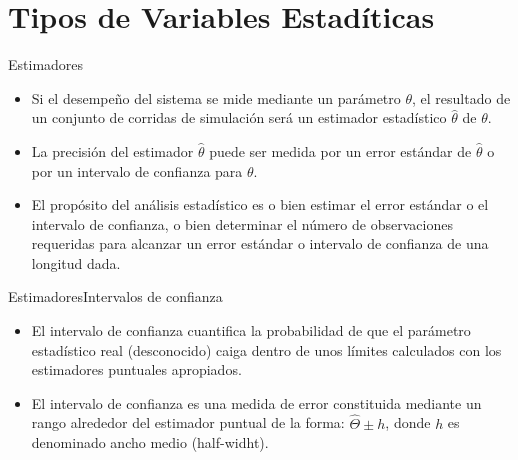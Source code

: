\section[Tipos de Estadísticas]{Tipos de Variables Estadíticas}

\begin{frame}{Estimadores}
    \begin{itemize}
        \item Si el desempeño del sistema se mide mediante un parámetro $\theta$, el resultado de un conjunto de corridas de simulación será un estimador estadístico $\hat{\theta}$ de $\theta$.
        \item La precisión del estimador $\hat{\theta}$ puede ser medida por un error estándar de $\hat{\theta}$ o por un intervalo de confianza para $\theta$.
        \item El propósito del análisis estadístico es o bien estimar el error estándar o el intervalo de confianza, o bien determinar el número de observaciones requeridas para alcanzar un error estándar o intervalo de confianza de una longitud dada.
    \end{itemize}
\end{frame}

\begin{frame}{Estimadores}{Intervalos de confianza}
    \begin{itemize}
        \item El intervalo de confianza cuantifica la probabilidad de que el parámetro estadístico real (desconocido) caiga dentro de unos límites calculados con los estimadores puntuales apropiados.
        \item El intervalo de confianza es una medida de error constituida mediante un rango alrededor del estimador puntual de la forma:
        $\hat{\Theta}\pm h$, donde $h$ es denominado ancho medio (half-widht).
    \end{itemize}
\end{frame}


